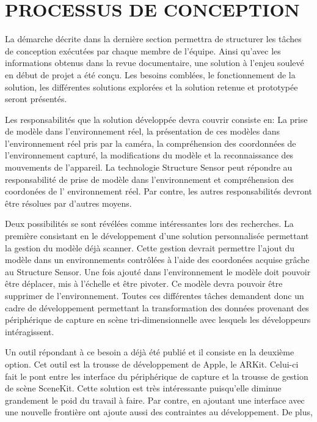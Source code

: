 \documentclass[letterpaper,twoside,12pt,french]{report}
\begin{document}
\chapter*{\uppercase{Processus de conception}}
La démarche décrite dans la dernière section permettra de structurer les tâches de conception
exécutées par chaque membre de l'équipe. Ainsi qu'avec les informations obtenus dans la revue
documentaire, une solution à l'enjeu soulevé en début de projet a été conçu. Les besoins comblées,
le fonctionnement de la solution, les différentes solutions explorées et la solution retenue et
prototypée seront présentés.
\par
Les responsabilités que la solution développée devra couvrir consiste en: La prise de modèle dans
l'environnement réel, la présentation de ces modèles dans l'environnement réel pris par la caméra,
la compréhension des coordonnées de l'environnement capturé, la modifications du modèle et la
reconnaissance des mouvements de l'appareil. La technologie Structure Sensor peut répondre au
responsabilité de prise de modèle dans l'environnement et compréhension des coordonées de l'
environnement réel. Par contre, les autres responsabilités devront être résolues par d'autres
moyens.
\par
Deux possibilités se sont révélées comme intéressantes lors des recherches. La première consistant
en le développement d'une solution personnalisée permettant la gestion du modèle déjà scanner.
Cette gestion devrait permettre l'ajout du modèle dans un environnements contrôlées à l'aide des
coordonées acquise grâche au Structure Sensor. Une fois ajouté dans l'environnement le modèle doit 
pouvoir être déplacer, mis à l'échelle et être pivoter. Ce modèle devra pouvoir être supprimer de
l'environnement. Toutes ces différentes tâches demandent donc un cadre de développement permettant
la transformation des données provenant des périphérique de capture en scène tri-dimensionnelle
avec lesquels les développeurs intéragissent.
\par
Un outil répondant à ce besoin a déjà été publié et il consiste en la deuxième option. Cet outil
est la trousse de développement de Apple, le ARKit. Celui-ci fait le pont entre les interface du
périphérique de capture et la trousse de gestion de scène SceneKit. Cette solution est très
intéressante puisqu'elle diminue grandement le poid du travail à faire. Par contre, en ajoutant une
interface avec une nouvelle frontière ont ajoute aussi des contraintes au développement. De plus,
\end{document}
